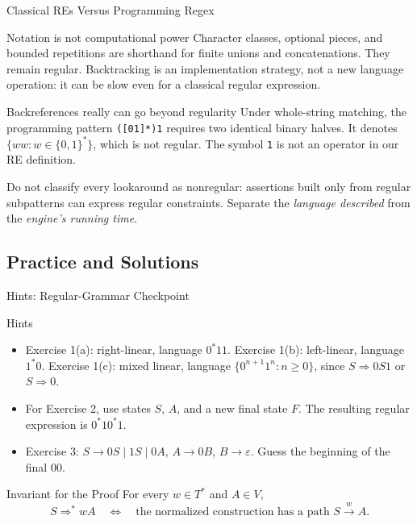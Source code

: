 \documentclass[10pt]{beamer}
\begin{document}
\begin{frame}{Classical REs Versus Programming Regex}
  \small
  \begin{block}{Notation is not computational power}
    Character classes, optional pieces, and bounded repetitions are shorthand
    for finite unions and concatenations. They remain regular. Backtracking
    is an implementation strategy, not a new language operation: it can be
    slow even for a classical regular expression.
  \end{block}
  \pause
  \begin{exampleblock}{Backreferences really can go beyond regularity}
    Under whole-string matching, the programming pattern
    \texttt{([01]*)1} requires two identical binary halves.
    It denotes $\{ww:w\in\{0,1\}^*\}$, which is not regular.
    The symbol \texttt{1} is not an operator in our RE definition.
  \end{exampleblock}
  \pause
  Do not classify every lookaround as nonregular: assertions built only from
  regular subpatterns can express regular constraints. Separate the
  \emph{language described} from the \emph{engine's running time}.
\end{frame}

\subsection{Practice and Solutions}

\begin{frame}{Hints: Regular-Grammar Checkpoint}
  \small
  \begin{block}{Hints}
    \begin{itemize}
      \item Exercise 1(a): right-linear, language $0^*11$.
        Exercise 1(b): left-linear, language $1^*0$.
        Exercise 1(c): mixed linear, language
        $\{0^{n+1}1^n:n\ge0\}$, since $S\Rightarrow0S1$ or $S\Rightarrow0$.
      \item For Exercise 2, use states $S$, $A$, and a new final state $F$.
        The resulting regular expression is $0^*10^*1$.
      \item Exercise 3: $S\to0S\mid1S\mid0A$, $A\to0B$,
        $B\to\varepsilon$. Guess the beginning of the final $00$.
    \end{itemize}
  \end{block}
  \pause
  \begin{exampleblock}{Invariant for the Proof}
    For every $w\in T^*$ and $A\in V$,
    \[
      S\Rightarrow^*wA
      \quad\Longleftrightarrow\quad
      \text{the normalized construction has a path }S\xrightarrow{w}A.
    \]
  \end{exampleblock}
\end{frame}
\end{document}
